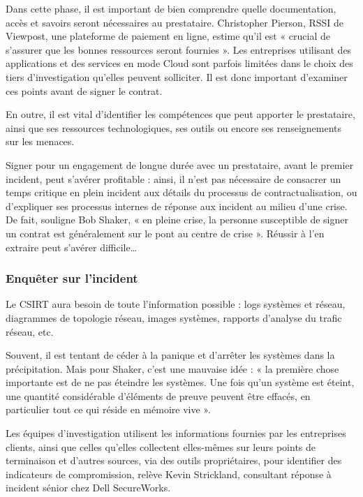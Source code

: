 Dans cette phase, il est important de bien comprendre quelle documentation, accès et savoirs seront nécessaires au prestataire. Christopher Pierson, RSSI de Viewpost, une plateforme de paiement en ligne, estime qu’il est « crucial de s’assurer que les bonnes ressources seront fournies ». Les entreprises utilisant des applications et des services en mode Cloud sont parfois limitées dans le choix des tiers d’investigation qu’elles peuvent solliciter. Il est donc important d’examiner ces points avant de signer le contrat.

En outre, il est vital d’identifier les compétences que peut apporter le prestataire, ainsi que ses ressources technologiques, ses outils ou encore ses renseignements sur les menaces.

Signer pour un engagement de longue durée avec un prestataire, avant le premier incident, peut s’avérer profitable : ainsi, il n’est pas nécessaire de consacrer un temps critique en plein incident aux détails du processus de contractualisation, ou d’expliquer ses processus internes de réponse aux incident au milieu d’une crise. De fait, souligne Bob Shaker, « en pleine crise, la personne susceptible de signer un contrat est généralement sur le pont au centre de crise ». Réussir à l’en extraire peut s’avérer difficile…

\subsubsection{Enquêter sur l’incident}

Le CSIRT aura besoin de toute l’information possible : logs systèmes et réseau, diagrammes de topologie réseau, images systèmes, rapports d’analyse du trafic réseau, etc.

Souvent, il est tentant de céder à la panique et d’arrêter les systèmes dans la précipitation. Mais pour Shaker, c’est une mauvaise idée : « la première chose importante est de ne pas éteindre les systèmes. Une fois qu’un système est éteint, une quantité considérable d’éléments de preuve peuvent être effacés, en particulier tout ce qui réside en mémoire vive ».

Les équipes d’investigation utilisent les informations fournies par les entreprises clients, ainsi que celles qu’elles collectent elles-mêmes sur leurs points de terminaison et d’autres sources, via des outils propriétaires, pour identifier des indicateurs de compromission, relève Kevin Strickland, consultant réponse à incident sénior chez Dell SecureWorks.

